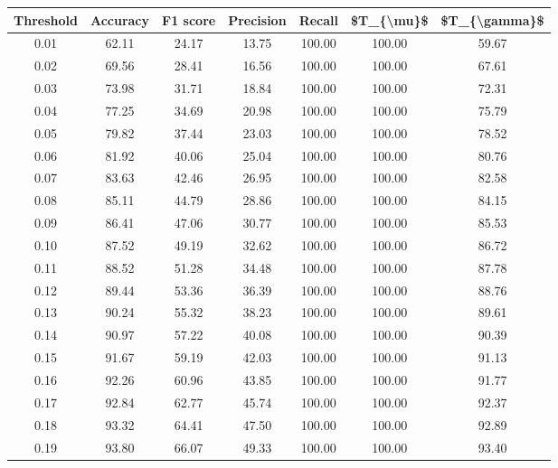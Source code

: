 \begin{tabular}{|c|c|c|c|c|c|c|}
\hline
 Threshold &  Accuracy &  F1 score &  Precision &  Recall &  \$T\_\{\textbackslash mu\}\$ &  \$T\_\{\textbackslash gamma\}\$ \\
\hline
      0.01 &     62.11 &     24.17 &      13.75 &  100.00 &     100.00 &         59.67 \\
      0.02 &     69.56 &     28.41 &      16.56 &  100.00 &     100.00 &         67.61 \\
      0.03 &     73.98 &     31.71 &      18.84 &  100.00 &     100.00 &         72.31 \\
      0.04 &     77.25 &     34.69 &      20.98 &  100.00 &     100.00 &         75.79 \\
      0.05 &     79.82 &     37.44 &      23.03 &  100.00 &     100.00 &         78.52 \\
      0.06 &     81.92 &     40.06 &      25.04 &  100.00 &     100.00 &         80.76 \\
      0.07 &     83.63 &     42.46 &      26.95 &  100.00 &     100.00 &         82.58 \\
      0.08 &     85.11 &     44.79 &      28.86 &  100.00 &     100.00 &         84.15 \\
      0.09 &     86.41 &     47.06 &      30.77 &  100.00 &     100.00 &         85.53 \\
      0.10 &     87.52 &     49.19 &      32.62 &  100.00 &     100.00 &         86.72 \\
      0.11 &     88.52 &     51.28 &      34.48 &  100.00 &     100.00 &         87.78 \\
      0.12 &     89.44 &     53.36 &      36.39 &  100.00 &     100.00 &         88.76 \\
      0.13 &     90.24 &     55.32 &      38.23 &  100.00 &     100.00 &         89.61 \\
      0.14 &     90.97 &     57.22 &      40.08 &  100.00 &     100.00 &         90.39 \\
      0.15 &     91.67 &     59.19 &      42.03 &  100.00 &     100.00 &         91.13 \\
      0.16 &     92.26 &     60.96 &      43.85 &  100.00 &     100.00 &         91.77 \\
      0.17 &     92.84 &     62.77 &      45.74 &  100.00 &     100.00 &         92.37 \\
      0.18 &     93.32 &     64.41 &      47.50 &  100.00 &     100.00 &         92.89 \\
      0.19 &     93.80 &     66.07 &      49.33 &  100.00 &     100.00 &         93.40 \\

\end{tabular}
